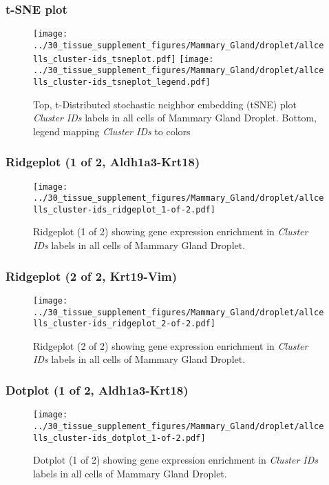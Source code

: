\clearpage
\subsubsection{t-SNE plot}
\begin{figure}[h]
\centering
\texttt{[image: ../30\_tissue\_supplement\_figures/Mammary\_Gland/droplet/allcells\_cluster-ids\_tsneplot.pdf]}
\texttt{[image: ../30\_tissue\_supplement\_figures/Mammary\_Gland/droplet/allcells\_cluster-ids\_tsneplot\_legend.pdf]}
\caption{Top, t-Distributed stochastic neighbor embedding (tSNE) plot  \emph{Cluster IDs} labels in all cells of Mammary Gland Droplet. Bottom, legend mapping \emph{Cluster IDs} to colors}
\end{figure}


\clearpage

\subsubsection{Ridgeplot (1 of 2, Aldh1a3-Krt18)}
\begin{figure}[h]
\centering
\texttt{[image: ../30\_tissue\_supplement\_figures/Mammary\_Gland/droplet/allcells\_cluster-ids\_ridgeplot\_1-of-2.pdf]}

\caption{ Ridgeplot (1 of 2)  showing gene expression enrichment in \emph{Cluster IDs} labels in all cells of Mammary Gland Droplet. }
\end{figure}


\clearpage

\subsubsection{Ridgeplot (2 of 2, Krt19-Vim)}
\begin{figure}[h]
\centering
\texttt{[image: ../30\_tissue\_supplement\_figures/Mammary\_Gland/droplet/allcells\_cluster-ids\_ridgeplot\_2-of-2.pdf]}

\caption{ Ridgeplot (2 of 2)  showing gene expression enrichment in \emph{Cluster IDs} labels in all cells of Mammary Gland Droplet. }
\end{figure}


\clearpage

\subsubsection{Dotplot (1 of 2, Aldh1a3-Krt18)}
\begin{figure}[h]
\centering
\texttt{[image: ../30\_tissue\_supplement\_figures/Mammary\_Gland/droplet/allcells\_cluster-ids\_dotplot\_1-of-2.pdf]}

\caption{ Dotplot (1 of 2)  showing gene expression enrichment in \emph{Cluster IDs} labels in all cells of Mammary Gland Droplet. }
\end{figure}



